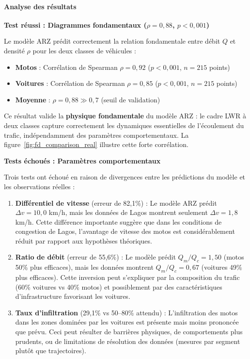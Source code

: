 \paragraph{Analyse des résultats}

\textbf{Test réussi : Diagrammes fondamentaux ($\rho = 0{,}88$, $p < 0{,}001$)}

Le modèle ARZ prédit correctement la relation fondamentale entre débit $Q$ et densité $\rho$ pour les deux classes de véhicules :
\begin{itemize}
    \item \textbf{Motos} : Corrélation de Spearman $\rho = 0{,}92$ ($p < 0{,}001$, $n = 215$ points)
    \item \textbf{Voitures} : Corrélation de Spearman $\rho = 0{,}85$ ($p < 0{,}001$, $n = 215$ points)
    \item \textbf{Moyenne} : $\rho = 0{,}88 \gg 0{,}7$ (seuil de validation)
\end{itemize}

Ce résultat valide la \textbf{physique fondamentale} du modèle ARZ : le cadre LWR à deux classes capture correctement les dynamiques essentielles de l'écoulement du trafic, indépendamment des paramètres comportementaux. La figure~\ref{fig:fd_comparison_real} illustre cette forte corrélation.

\textbf{Tests échoués : Paramètres comportementaux}

Trois tests ont échoué en raison de divergences entre les prédictions du modèle et les observations réelles :

\begin{enumerate}
    \item \textbf{Différentiel de vitesse} (erreur de 82,1\%) : Le modèle ARZ prédit $\Delta v = 10{,}0$ km/h, mais les données de Lagos montrent seulement $\Delta v = 1{,}8$ km/h. Cette différence importante suggère que dans les conditions de congestion de Lagos, l'avantage de vitesse des motos est considérablement réduit par rapport aux hypothèses théoriques.

    \item \textbf{Ratio de débit} (erreur de 55,6\%) : Le modèle prédit $Q_m / Q_c = 1{,}50$ (motos 50\% plus efficaces), mais les données montrent $Q_m / Q_c = 0{,}67$ (voitures 49\% plus efficaces). Cette inversion peut s'expliquer par la composition du trafic (60\% voitures vs 40\% motos) et possiblement par des caractéristiques d'infrastructure favorisant les voitures.

    \item \textbf{Taux d'infiltration} (29,1\% vs 50--80\% attendu) : L'infiltration des motos dans les zones dominées par les voitures est présente mais moins prononcée que prévu. Ceci peut résulter de barrières physiques, de comportements plus prudents, ou de limitations de résolution des données (mesures par segment plutôt que trajectoires).
\end{enumerate}

